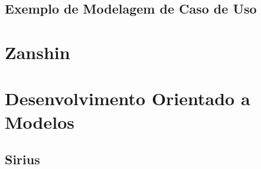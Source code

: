 
\subsection{Exemplo de Modelagem de Caso de Uso}
\label{sec-referencial-engenharia-objetivos-exemplo}



\section{Zanshin}
\label{sec-referencial-engenharia-software-atividade-desenvolvimento-projeto}





\section{Desenvolvimento Orientado a Modelos}

\subsection{Sirius}


